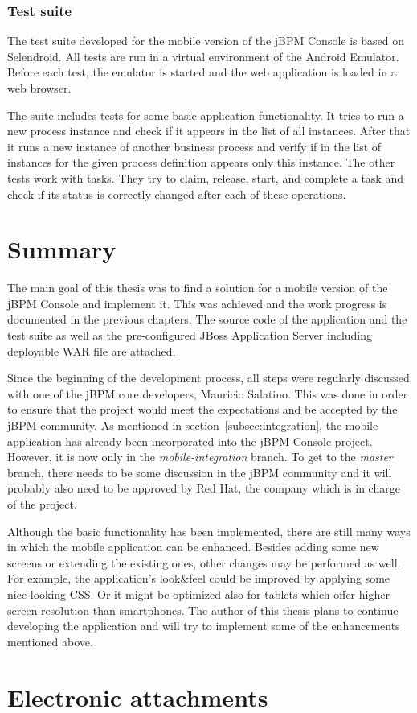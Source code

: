 \documentclass[12pt,oneside,final]{fithesis2}
\begin{document}
\subsection{Test suite}
\label{subsec:test-suite}
The test suite developed for the mobile version of the jBPM Console is based on Selendroid.
All tests are run in a virtual environment of the Android Emulator.
Before each test, the emulator is started and the web application is loaded in a web browser.

The suite includes tests for some basic application functionality.
It tries to run a new process instance and check if it appears in the list of all instances.
After that it runs a new instance of another business process and verify if in the list of instances for the given process definition appears only this instance.
The other tests work with tasks.
They try to claim, release, start, and complete a task and check if its status is correctly changed after each of these operations.

\chapter{Summary}
The main goal of this thesis was to find a solution for a mobile version of the jBPM Console and implement it.
This was achieved and the work progress is documented in the previous chapters.
The source code of the application and the test suite as well as the pre-configured JBoss Application Server including deployable WAR file are attached.

Since the beginning of the development process, all steps were regularly discussed with one of the jBPM core developers, Mauricio Salatino.
This was done in order to ensure that the project would meet the expectations and be accepted by the jBPM community.
As mentioned in section~\ref{subsec:integration}, the mobile application has already been incorporated into the jBPM Console project.
However, it is now only in the \emph{mobile-integration} branch.
To get to the \emph{master} branch, there needs to be some discussion in the jBPM community and it will probably also need to be approved by Red Hat, the company which is in charge of the project.

Although the basic functionality has been implemented, there are still many ways in which the mobile application can be enhanced.
Besides adding some new screens or extending the existing ones, other changes may be performed as well.
For example, the application's look\&feel could be improved by applying some nice-looking CSS.
Or it might be optimized also for tablets which offer higher screen resolution than smartphones.
The author of this thesis plans to continue developing the application and will try to implement some of the enhancements mentioned above.

\printbibliography

\appendix

\chapter{Electronic attachments}
\end{document}
